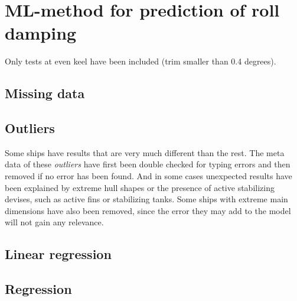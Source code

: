 \section{ML-method for prediction of roll damping}
\label{se:regression} 

Only tests at even keel have been included (trim smaller than 0.4 degrees). 

\subsection{Missing data}

\subsection{Outliers}
Some ships have results that are very much different than the rest. The meta data of these  \emph{outliers} have first been double checked for typing errors and then removed if no error has been found. And in some cases unexpected results have been explained by extreme hull shapes or the presence of active stabilizing devises, such as active fins or stabilizing tanks.
Some ships with extreme main dimensions have also been removed, since the error they may add to the model will not gain any relevance.



\subsection{Linear regression}

\subsection{Regression}